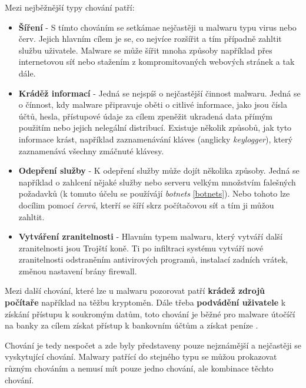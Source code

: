Mezi nejběžnější typy chování patří: \cite{article_malware}
\begin{itemize}
    \item \textbf{Šíření} - S tímto chováním se setkámae nejčastěji u malwaru typu virus nebo červ. Jejich hlavním cílem je se, co nejvíce rozšířit a tím případně zahltit službu uživatele. Malware se může šířit mnoha způsoby například přes internetovou síť nebo stažením z kompromitovaných webových stránek a tak dále.
    \item \textbf{Kráděž informací} - Jedná se nejspíš o nejčastější činnost malwaru. Jedná se o čínnost, kdy malware připravuje oběti o citlivé informace, jako jsou čísla účtů, hesla, přístupové údaje za cílem zpeněžit ukradená data přímým použitím nebo jejich nelegální distribucí. Existuje několik způsobů, jak tyto informace krást, například zaznamenávání kláves (anglicky \textit{keylogger}), který zaznamenává všechny zmáčnuté klávesy.
    \item \textbf{Odepření služby} - K odepření služby může dojít několika způsoby. Jedná se například o zahlcení nějaké služby nebo serveru velkým množstvím falešných požadavků (k tomuto účelu se používájí \textit{botnets} \ref{botnets}). Nebo tohoto lze docílim pomocí \textit{červů}, kterří se šíří skrz počítačovou síť a tím ji můžou zahltit.
    \item \textbf{Vytváření zranitelnosti} - Hlavním typem malwaru, který vytváří další zranitelnosti jsou Trojští koně. Ti po infiltraci systému vytváří nové zranitelnosti odstraněním antivirových programů, instalací zadních vrátek, změnou nastavení brány firewall.
\end{itemize}

Mezi další chování, které lze u malwaru pozorovat patří \textbf{krádež zdrojů počítaře} například na těžbu kryptoměn. Dále třeba \textbf{podvádění uživatele} k získání přístupu k soukromým datům, toto chování je běžné pro malware útočíčí na banky za cílem získat přístup k bankovním účtům a získat peníze \cite{article_malware}.

Chování je tedy nespočet a zde byly představeny pouze nejznámější a nejčastěji se vyskytující chování. Malwary patřící do stejného typu se můžou prokazovat různým chováním a nemusí mít pouze jedno chování, ale kombinace těchto chování.
